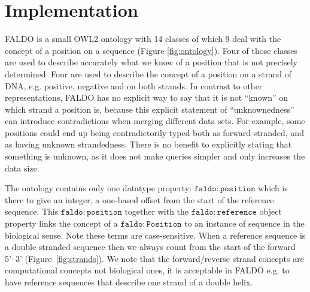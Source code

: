 \section*{Implementation}

FALDO is a small OWL2 ontology with 14 classes of which 9 deal with the concept of a position on a sequence (Figure \ref{fig:ontology}).
Four of those classes are used to describe accurately what we know of a position that is not precisely determined.
Four are used to describe the concept of a position on a strand of DNA, e.g. positive, negative and on both strands.
In contrast to other representations, FALDO has no explicit way to say that it is not ``known'' on which strand a position is, because this explicit statement of ``unknownedness'' can introduce contradictions when merging different data sets.
For example, some positions could end up being contradictorily typed both as forward-stranded, and as having unknown strandedness.
There is no benefit to explicitly stating that something is unknown, as it does not make queries simpler
and only increases the data size.

The ontology contains only one datatype property: $\mathtt{faldo\colon{}position}$ which is there to give an integer,
a one-based offset from the start of the reference sequence.
This $\mathtt{faldo\colon{}position}$ together with the $\mathtt{faldo\colon{}reference}$ object property links the concept
of a $\mathtt{faldo\colon{}Position}$ to an instance of sequence in the biological sense.
Note these terms are case-sensitive. 
When a reference sequence is a double stranded sequence then we always count from the start of the forward 5'--3' (Figure~\ref{fig:strands}). 
We note that the forward/reverse strand concepts are computational concepts not biological ones, it is acceptable in FALDO e.g. to have reference sequences that describe one strand of a double helix.

